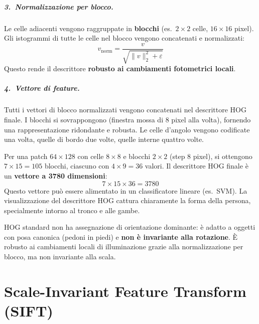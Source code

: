 \documentclass[12pt, a4paper]{report}
\begin{document}
\paragraph{3.\ Normalizzazione per blocco.}
Le celle adiacenti vengono raggruppate in \textbf{blocchi} (es.\ $2\times2$ celle,
$16\times16$ pixel). Gli istogrammi di tutte le celle nel blocco vengono
concatenati e normalizzati:
\[
  v_{\mathrm{norm}} = \frac{v}{\sqrt{\|v\|_2^2+\varepsilon}}
\]
Questo rende il descrittore \textbf{robusto ai cambiamenti fotometrici locali}.

\paragraph{4.\ Vettore di feature.}
Tutti i vettori di blocco normalizzati vengono concatenati nel descrittore HOG
finale. I blocchi si sovrappongono (finestra mossa di 8 pixel alla volta),
fornendo una rappresentazione ridondante e robusta. Le celle d'angolo vengono
codificate una volta, quelle di bordo due volte, quelle interne quattro volte.

\begin{notebox}
Per una patch $64\times128$ con celle $8\times8$ e blocchi $2\times2$ (step 8
pixel), si ottengono $7\times15=105$ blocchi, ciascuno con $4\times9=36$ valori.
Il descrittore HOG finale è un \textbf{vettore a 3780 dimensioni}:
\[
  7\times15\times36 = 3780
\]
Questo vettore può essere alimentato in un classificatore lineare (es.\ SVM).
La visualizzazione del descrittore HOG cattura chiaramente la forma della persona,
specialmente intorno al tronco e alle gambe.
\end{notebox}

\begin{propbox}
HOG standard non ha assegnazione di orientazione dominante: è adatto a oggetti
con posa canonica (pedoni in piedi) e \textbf{non è invariante alla rotazione}.
\`E robusto ai cambiamenti locali di illuminazione grazie alla normalizzazione
per blocco, ma non invariante alla scala.
\end{propbox}

\chapter{Scale-Invariant Feature Transform (SIFT)}
\end{document}
